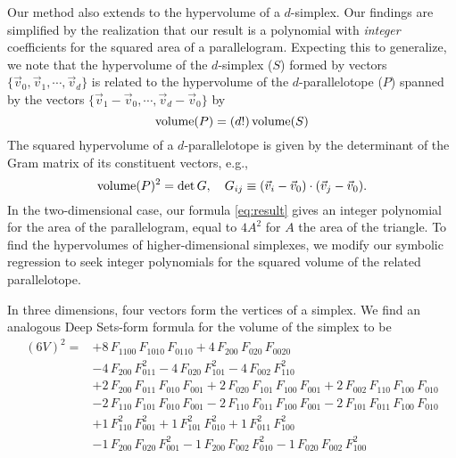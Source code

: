 \documentclass[12pt]{article}
\begin{document}
Our method also extends to the hypervolume of a $d$-simplex. Our findings are simplified by the realization that our result is a polynomial with \emph{integer} coefficients for the squared area of a parallelogram. Expecting this to generalize, we note that the hypervolume of the $d$-simplex ($S$) formed by vectors $\{ \vec{v}_{0}, \vec{v}_{1}, \cdots, \vec{v}_{d} \}$ is related to the hypervolume of the $d$-parallelotope ($P$) spanned by the vectors $\{ \vec{v}_{1} - \vec{v}_0, \cdots, \vec{v}_d - \vec{v}_0 \}$ by
\begin{equation}
    {\rm volume}(P)
    = (d!) \, {\rm volume}(S)
\end{equation}
The squared hypervolume of a $d$-parallelotope is given by the determinant of the Gram matrix of its constituent vectors, e.g.,
\begin{equation}
    {\rm volume}(P)^2
    = \det G, \quad
    G_{ij} \equiv (\vec{v}_i - \vec{v}_0) \cdot (\vec{v}_j - \vec{v}_0).
\end{equation}
In the two-dimensional case, our formula \eqref{eq:result} gives an integer polynomial for the area of the parallelogram, equal to $4 A^2$ for $A$ the area of the triangle. To find the hypervolumes of higher-dimensional simplexes, we modify our symbolic regression to seek integer polynomials for the squared volume of the related parallelotope.

In three dimensions, four vectors form the vertices of a simplex. We find an analogous Deep Sets-form formula for the volume of the simplex to be
\begin{align}
(6 V)^2 = &
+8 \, F_{1100} \, F_{1010} \, F_{0110}
+4 \, F_{200} \, F_{020} \, F_{0020}
\nonumber \\ &
-4 \, F_{200} \, F_{011}^2
-4 \, F_{020} \, F_{101}^2
-4 \, F_{002} \, F_{110}^2
\nonumber \\ &
+2 \, F_{200} \, F_{011} \, F_{010} \, F_{001}
+2 \, F_{020} \, F_{101} \, F_{100} \, F_{001}
+2 \, F_{002} \, F_{110} \, F_{100} \, F_{010}
\nonumber \\ &
-2 \, F_{110} \, F_{101} \, F_{010} \, F_{001}
-2 \, F_{110} \, F_{011} \, F_{100} \, F_{001}
-2 \, F_{101} \, F_{011} \, F_{100} \, F_{010}
\nonumber \\ &
+1 \, F_{110}^2 \, F_{001}^2
+1 \, F_{101}^2 \, F_{010}^2
+1 \, F_{011}^2 \, F_{100}^2
\nonumber \\ &
-1 \, F_{200} \, F_{020} \, F_{001}^2
-1 \, F_{200} \, F_{002} \, F_{010}^2
-1 \, F_{020} \, F_{002} \, F_{100}^2
\label{eq:simplex}
\end{align}
\end{document}
